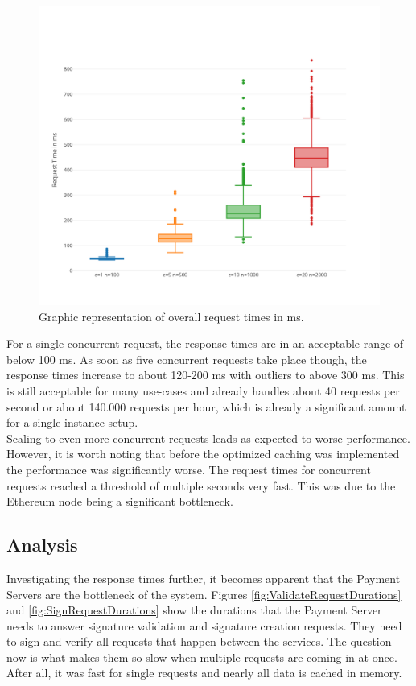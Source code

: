 \documentclass[a4paper,12pt]{scrartcl}
\begin{document}
\begin{figure}[H]
\centering
\includegraphics[width=350pt]{Images/OverallRequestTimesDiagram.png}
\caption{Graphic representation of overall request times in ms.}
\label{fig:OverallRequestTimesDiagram}
\end{figure}

For a single concurrent request, the response times are in an acceptable range of below 100 ms. As soon as five concurrent requests take place though, the response times increase to about 120-200 ms with outliers to above 300 ms. This is still acceptable for many use-cases and already handles about 40 requests per second or about 140.000 requests per hour, which is already a significant amount for a single instance setup.\\

Scaling to even more concurrent requests leads as expected to worse performance. However, it is worth noting that before the optimized caching was implemented the performance was significantly worse. The request times for concurrent requests reached a threshold of multiple seconds very fast. This was due to the Ethereum node being a significant bottleneck.\\

\subsection{Analysis}

Investigating the response times further, it becomes apparent that the Payment Servers are the bottleneck of the system. Figures \ref{fig:ValidateRequestDurations} and \ref{fig:SignRequestDurations} show the durations that the Payment Server needs to answer signature validation and signature creation requests. They need to sign and verify all requests that happen between the services. The question now is what makes them so slow when multiple requests are coming in at once. After all, it was fast for single requests and nearly all data is cached in memory.\\
\end{document}
